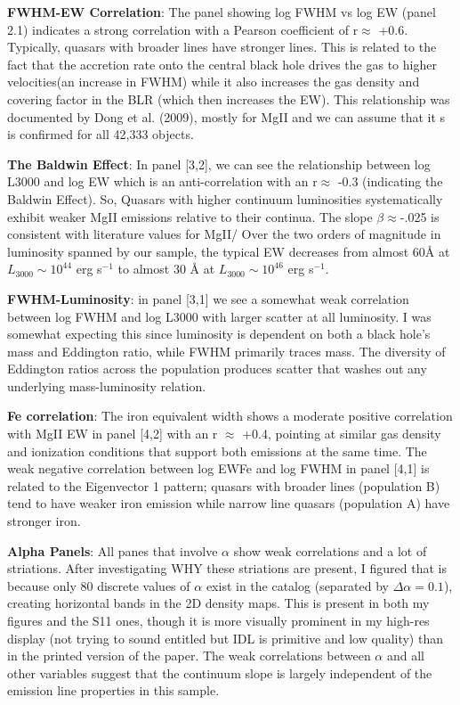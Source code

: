 \documentclass[11pt,a4paper]{article}
\begin{document}
\textbf{FWHM-EW Correlation}: The panel showing log FWHM vs log EW (panel 2.1) indicates a strong correlation with a Pearson coefficient of r$\approx$ +0.6. Typically, quasars with broader lines have stronger lines. This is related to the fact that the accretion rate onto the central black hole drives the gas to higher velocities(an increase in FWHM) while it also increases the gas density and covering factor in the BLR (which then increases the EW). This relationship was documented by Dong et al. (2009), mostly for MgII and we can assume that it s is confirmed for all 42,333 objects.

\textbf{The Baldwin Effect}: In panel [3,2], we can see the relationship between log L3000 and log EW which is an anti-correlation with an r$\approx$ -0.3 (indicating the Baldwin Effect). So, Quasars with higher continuum luminosities systematically exhibit weaker MgII emissions relative to their continua. The slope $\beta \approx$-.025 is consistent with literature values for MgII/ Over the two orders of magnitude in luminosity spanned by our sample, the typical EW decreases from almost 60Å at $L_{3000} \sim 10^{44}$ erg s$^{-1}$ to almost 30 Å at $L_{3000} \sim 10^{46}$ erg s$^{-1}$.

\textbf{FWHM-Luminosity}: in panel [3,1] we see a somewhat weak correlation between log FWHM and log L3000 with larger scatter at all luminosity. I was somewhat expecting this since luminosity is dependent on both a black hole's mass and Eddington ratio, while FWHM primarily traces mass. The diversity of Eddington ratios across the population produces scatter that washes out any underlying mass-luminosity relation.

\textbf{Fe correlation}: The iron equivalent width shows a moderate positive correlation with MgII EW in panel [4,2] with an r $\approx$ +0.4, pointing at similar gas density and ionization conditions that support both emissions at the same time. The weak negative correlation between log EWFe and log FWHM in panel [4,1] is related to the Eigenvector 1 pattern; quasars with broader lines (population B) tend to have weaker iron emission while narrow line quasars (population A) have stronger iron.

\textbf{Alpha Panels}: All panes that involve $\alpha$ show weak correlations and a lot of striations. After investigating WHY these striations are present, I figured that is because only 80 discrete values of $\alpha$ exist in the catalog (separated by $\Delta \alpha=0.1$), creating horizontal bands in the 2D density maps. This is present in both my figures and the S11 ones, though it is more visually prominent in my high-res display (not trying to sound entitled but IDL is primitive and low quality) than in the printed version of the paper. The weak correlations between $\alpha$ and all other variables suggest that the continuum slope is largely independent of the emission line properties in this sample.
\end{document}
